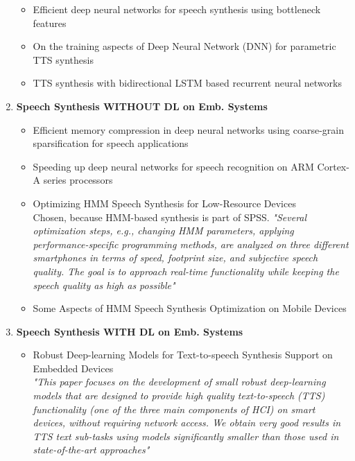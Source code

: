 \begin{enumerate}[leftmargin=16pt]
\begin{itemize}[leftmargin=10pt]
		\item \textcolor{black!40}{Efficient deep neural networks for speech synthesis using bottleneck features \cite{joo:efficient}}
		\item \textcolor{black!40}{On the training aspects of Deep Neural Network (DNN) for parametric TTS synthesis \cite{qian:training}}
		\item \textcolor{black!40}{TTS synthesis with bidirectional LSTM based recurrent neural networks \cite{fan:tts}}
	\end{itemize}
	\vspace{1em}
	\item \textbf{Speech Synthesis WITHOUT DL on Emb. Systems}
	\begin{itemize}[leftmargin=10pt]
		\item \textcolor{black!40}{Efficient memory compression in deep neural networks using coarse-grain sparsification for speech applications \cite{kadetotad:efficient}}
		\item \textcolor{black!40}{Speeding up deep neural networks for speech recognition on ARM Cortex-A series processors \cite{xing:speeding}}
		\item \textcolor{ACMRed}{Optimizing HMM Speech Synthesis for Low-Resource Devices} \cite{toth:optimizing}\\
		Chosen, because \ac{HMM}-based synthesis is part of \ac{SPSS}. \textit{"Several optimization steps, e.g., changing HMM parameters, applying performance-specific programming methods, are analyzed on three different smartphones in terms of speed, footprint size, and	subjective speech quality. The goal is to approach real-time functionality while keeping the speech quality as high as possible"}
		\item \textcolor{black!40}{Some Aspects of HMM Speech Synthesis Optimization on Mobile Devices \cite{toth:aspects}}
	\end{itemize}
	\vspace{1em}
	\item \textbf{Speech Synthesis WITH DL on Emb. Systems}
	\begin{itemize}[leftmargin=10pt]
		\item \textcolor{ACMRed}{Robust Deep-learning Models for Text-to-speech Synthesis Support on Embedded Devices} \cite{boros:robust} \\ \textit{"This paper focuses on the development of small robust deep-learning models that are designed to provide high quality text-to-speech (TTS) functionality (one of the three main components of HCI) on smart devices, without requiring network access. We obtain very good results in TTS text sub-tasks using models significantly smaller than those used in state-of-the-art approaches"}
	\end{itemize}
\end{enumerate}
\fi

